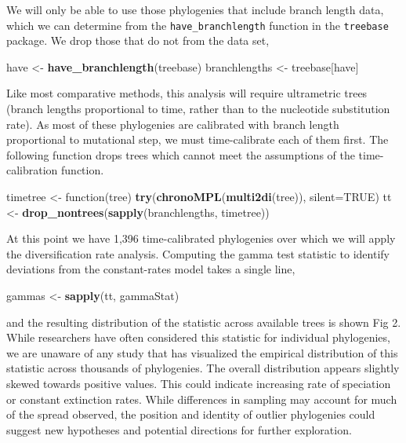 \documentclass[author-year, 8pt, 3p]{elsarticle} %
\newenvironment{Shaded}{}{}
\newcommand{\KeywordTok}[1]{\textcolor[rgb]{0.00,0.44,0.13}{\textbf{{#1}}}}
\newcommand{\DataTypeTok}[1]{\textcolor[rgb]{0.56,0.13,0.00}{{#1}}}
\newcommand{\OtherTok}[1]{\textcolor[rgb]{0.00,0.44,0.13}{{#1}}}
\newcommand{\NormalTok}[1]{{#1}}
\begin{document}
We will only be able to use those phylogenies that include branch length
data, which we can determine from the \texttt{have\_branchlength}
function in the \texttt{treebase} package. We drop those that do not
from the data set,

\begin{Shaded}
\begin{Highlighting}[]
      \NormalTok{have <- }\KeywordTok{have_branchlength}\NormalTok{(treebase)}
      \NormalTok{branchlengths <- treebase[have]}
\end{Highlighting}
\end{Shaded}
Like most comparative methods, this analysis will require ultrametric
trees (branch lengths proportional to time, rather than to the
nucleotide substitution rate). As most of these phylogenies are
calibrated with branch length proportional to mutational step, we must
time-calibrate each of them first. The following function drops trees
which cannot meet the assumptions of the time-calibration function.

\begin{Shaded}
\begin{Highlighting}[]
\NormalTok{timetree <- function(tree)}
    \KeywordTok{try}\NormalTok{(}\KeywordTok{chronoMPL}\NormalTok{(}\KeywordTok{multi2di}\NormalTok{(tree)), }\DataTypeTok{silent=}\OtherTok{TRUE}\NormalTok{) }
\NormalTok{tt <- }\KeywordTok{drop_nontrees}\NormalTok{(}\KeywordTok{sapply}\NormalTok{(branchlengths, timetree))}
\end{Highlighting}
\end{Shaded}
At this point we have 1,396 time-calibrated phylogenies over which we
will apply the diversification rate analysis. Computing the gamma test
statistic to identify deviations from the constant-rates model takes a
single line,

\begin{Shaded}
\begin{Highlighting}[]
\NormalTok{gammas <- }\KeywordTok{sapply}\NormalTok{(tt,  gammaStat)}
\end{Highlighting}
\end{Shaded}
and the resulting distribution of the statistic across available trees
is shown Fig 2. While researchers have often considered this statistic
for individual phylogenies, we are unaware of any study that has
visualized the empirical distribution of this statistic across thousands
of phylogenies. The overall distribution appears slightly skewed towards
positive values. This could indicate increasing rate of speciation or
constant extinction rates. While differences in sampling may account for
much of the spread observed, the position and identity of outlier
phylogenies could suggest new hypotheses and potential directions for
further exploration.
\end{document}
